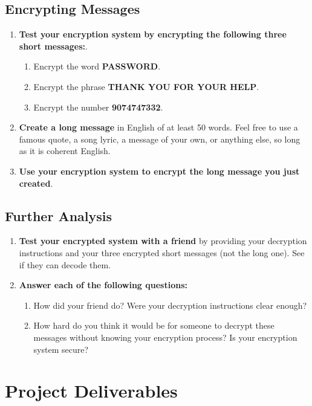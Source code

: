 \subsection*{Encrypting Messages}
\begin{enumerate}
  \item {\bf Test your encryption system by encrypting the
      following three short messages:}.
    \begin{enumerate}
    \item Encrypt the word {\bf PASSWORD}.
    \item Encrypt the phrase {\bf THANK YOU FOR YOUR HELP}.
    \item Encrypt the number {\bf 9074747332}.
    \end{enumerate}
  \item {\bf Create a long message} in English of at least 50
    words. Feel free to use a famous quote, a song lyric, a message of
    your own, or anything else, so long as it is coherent English.
  \item {\bf Use your encryption system to encrypt the long message you
      just created}.
\end{enumerate}


\subsection*{ Further Analysis}
\begin{enumerate}
\item {\bf Test your encrypted system with a friend} by providing your
  decryption instructions and
  your three encrypted short messages (not the long one). See if they
  can decode them.
\item {\bf Answer each of the following questions:}
  \begin{enumerate}
  \item How did your friend do? Were your decryption instructions
    clear enough?
  \item How hard do you think it would be for someone to decrypt
    these messages
    without knowing your encryption process? Is your encryption system
    secure?
  \end{enumerate}
\end{enumerate}


\section{Project Deliverables}

